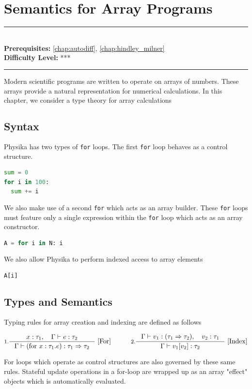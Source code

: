 \documentclass[book.tex]{subfiles}
\begin{document}
\chapter{Semantics for Array Programs}

\label{chap:grammar}
\noindent\rule{11cm}{0.4pt} \\
\textbf{Prerequisites:} \autoref{chap:autodiff}, \autoref{chap:hindley_milner}  \\
\textbf{Difficulty Level:} *** \\
\noindent\rule{11cm}{0.4pt}
\vspace{5mm}

Modern scientific programs are written to operate on arrays of numbers. These arrays provide a natural representation for numerical calculations. In this chapter, we consider a type theory for array calculations

\section{Syntax}

Physika has two types of \lstinline{for} loops. The first \lstinline{for} loop behaves as a control structure.
\begin{lstlisting}[language=python]
sum = 0
for i in 100:
  sum += i
\end{lstlisting}

We also make use of a second \lstinline{for} which acts as an array builder. These \lstinline{for} loops must feature only a single expression within the \lstinline{for} loop which acts as an array constructor.

\begin{lstlisting}[language=python]
A = for i in N: i
\end{lstlisting}

We also allow Physika to perform indexed access to array elements
\begin{lstlisting}[language=python]
A[i]
\end{lstlisting}

\section{Types and Semantics}

Typing rules for array creation and indexing are defined as follows 

\begin{alignat*}{2}
    &\inference[1.]
    {
     x: \tau_1, \quad \Gamma \vdash e : \tau_2
    }
    {
    \Gamma \vdash (\textrm{for}\ x : \tau_1. e) : \tau_1 \Rightarrow \tau_2
    } \ \textrm{[For]} &&\qquad
    \inference[2.]
    {
     \Gamma \vdash v_1: (\tau_1 \Rightarrow \tau_2), \quad v_2 : \tau_1
    }
    {
     \Gamma \vdash v_1[v_2] : \tau_2 
    } \ \textrm{[Index]} \\
\end{alignat*}

For loops which operate as control structures are also governed by these same rules. Stateful update operations in a for-loop are wrapped up as an array "effect" objects which is automatically evaluated.
\end{document}

